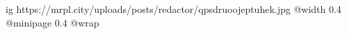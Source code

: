  
 
 
 
 

\ifcmt
  ig https://mrpl.city/uploads/posts/redactor/qpsdruoojeptuhek.jpg
  @width 0.4
  @minipage 0.4
  @wrap \parpic[r]
\fi
